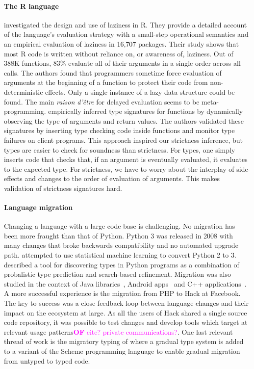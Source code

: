 \documentclass[review,nonacm,screen,acmsmall,anonymous=true]{acmart}
\newcommand{\authorcomment}[3]{\xspace\textcolor{#1}{{\bf #2} #3}\xspace}
\newcommand{\OF}[1]{\authorcomment{magenta}{OF}{#1}}
\begin{document}
\paragraph{The R language} \citet{oopsla19b} investigated the design and use of
laziness in R. They provide a detailed account of the language's evaluation
strategy with a small-step operational semantics and an empirical evaluation of
laziness in 16,707 packages. Their study shows that most R code is written
without reliance on, or awareness of, laziness. Out of 388K functions, 83\%
evaluate all of their arguments in a single order across all calls. The authors
found that programmers sometime force evaluation of arguments at the beginning
of a function to protect their code from non-deterministic effects. Only a
single instance of a lazy data structure could be found. The main \emph{raison
d'\^etre} for delayed evaluation seems to be meta-programming. \citet{oopsla20b}
empirically inferred type signatures for functions by dynamically observing the
type of arguments and return values. The authors validated these signatures by
inserting type checking code inside functions and monitor type failures on
client programs. This approach inspired our strictness inference, but types are
easier to check for soundness than strictness. For types, one simply inserts
code that checks that, if an argument is eventually evaluated, it evaluates to
the expected type. For strictness, we have to worry about the interplay of
side-effects and changes to the order of evaluation of arguments. This makes
validation of strictness signatures hard.

\paragraph{Language migration} Changing a language with a large code base
is challenging. No migration has been more fraught than that of Python. Python 3
was released in 2008 with many changes that broke backwards compatibility and no
automated upgrade path. \citet{Agg15} attempted to use statistical machine
learning to convert Python 2 to 3. \citet{Pra20} described a tool for
discovering types in Python programs as a combination of probalistic type
prediction and search-based refinement. Migration was also studied in the context of
Java libraries~\cite{Xu19}, Android apps~\cite{Orso20} and C++
applications~\cite{OB20}. A more successful experience is the migration from PHP
to Hack at Facebook. The key to success was a close feedback loop between
language changes and their impact on the ecosystem at large. As all the users of
Hack shared a single source code repository, it was possible to test changes and
develop tools which target at relevant usage patterns\OF{cite? private
communications?}. One last relevant thread of
work is the migratory typing of \citet{matthias06} where a gradual type system
is added to a variant of the Scheme programming language to enable gradual
migration from untyped to typed code.
\end{document}
